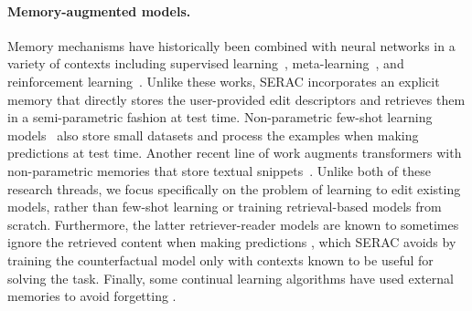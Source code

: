 \documentclass{article}
\newcommand{\name}{SERAC}
\begin{document}
\paragraph{Memory-augmented models.} Memory mechanisms have historically been combined with neural networks in a variety of contexts including supervised learning~\citep{hochreiter1997long,graves2008novel,graves2014neural}, meta-learning~\citep{santoro2016memory, shan2020meta}, and reinforcement learning~\citep{oh2016control,pritzel2017neural}. Unlike these works, {\name} incorporates an explicit memory that directly stores the user-provided edit descriptors and retrieves them in a semi-parametric fashion at test time. Non-parametric few-shot learning models~\cite{koch2015siamese,vinyals2016matching,snell2017prototypical} also store small datasets and process the examples when making predictions at test time. Another recent line of work augments transformers with non-parametric memories that store textual snippets~\citep{Chen2017ReadingWT,Lee2019LatentRF,Khandelwal2020GeneralizationTM,karpukhin-etal-2020-dense}. Unlike both of these research threads, we focus specifically on the problem of learning to edit existing models, rather than few-shot learning or training retrieval-based models from scratch. Furthermore, the latter retriever-reader models are known to sometimes ignore the retrieved content when making predictions \citep{lewis2020retrieval,Paranjape2021HindsightPT}, which {\name} avoids by training the counterfactual model only with contexts known to be useful for solving the task. Finally, some continual learning algorithms have used external memories to avoid forgetting \citep{lopez2017gradient,rolnick2019experience,buzzega2020dark}.

\end{document}
